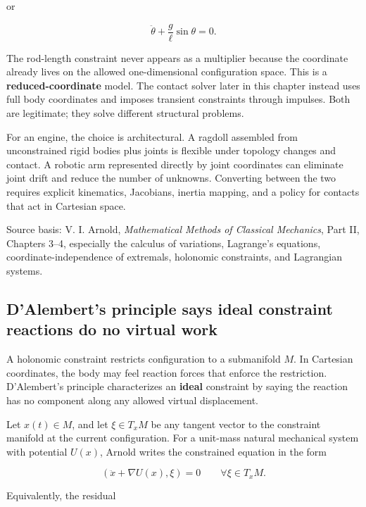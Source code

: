 or

\[
\ddot\theta+\frac{g}{\ell}\sin\theta=0.
\]

The rod-length constraint never appears as a multiplier because the coordinate already lives on the allowed one-dimensional configuration space. This is a \textbf{reduced-coordinate} model. The contact solver later in this chapter instead uses full body coordinates and imposes transient constraints through impulses. Both are legitimate; they solve different structural problems.

For an engine, the choice is architectural. A ragdoll assembled from unconstrained rigid bodies plus joints is flexible under topology changes and contact. A robotic arm represented directly by joint coordinates can eliminate joint drift and reduce the number of unknowns. Converting between the two requires explicit kinematics, Jacobians, inertia mapping, and a policy for contacts that act in Cartesian space.

Source basis: V. I. Arnold, \emph{Mathematical Methods of Classical Mechanics}, Part II, Chapters 3--4, especially the calculus of variations, Lagrange's equations, coordinate-independence of extremals, holonomic constraints, and Lagrangian systems.

\subsection{D'Alembert's principle says ideal constraint reactions do no virtual work}\label{06-engine-ii-ch033-dalemberts-principle-says-ideal-constraint-reactions-do-no-virtual-work}

\hypertarget{06-engine-ii-ch033-dalemberts-principle-says-ideal-constraint-reactions-do-no-virtual-work}{}

A holonomic constraint restricts configuration to a submanifold \(M\). In Cartesian coordinates, the body may feel reaction forces that enforce the restriction. D'Alembert's principle characterizes an \textbf{ideal} constraint by saying the reaction has no component along any allowed virtual displacement.

Let \(x(t)\in M\), and let \(\xi\in T_xM\) be any tangent vector to the constraint manifold at the current configuration. For a unit-mass natural mechanical system with potential \(U(x)\), Arnold writes the constrained equation in the form

\[
\left(
\ddot x+\nabla U(x),
\xi
\right)
=
0
\qquad
\forall \xi\in T_xM.
\]

Equivalently, the residual


